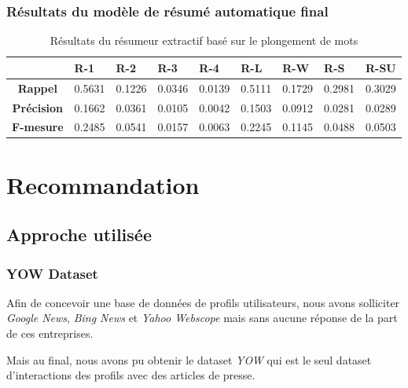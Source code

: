         \subsubsection{Résultats du modèle de résumé automatique final}
        \begin{table}[H]
            \begin{center}
                \begin{tabular}{|c|C{1.2cm}|C{1.2cm}|C{1.2cm}|C{1.2cm}|C{1.2cm}|C{1.2cm}|C{1.2cm}|C{1.2cm}|}
                     & \textbf{R-1} &  \textbf{R-2} &  \textbf{R-3} &  \textbf{R-4} &  \textbf{R-L} &  \textbf{R-W} &  \textbf{R-S} &  \textbf{R-SU} \\
                    \hline
                    \textbf{Rappel} & 0.5631 & 0.1226 & 0.0346 & 0.0139 & 0.5111 & 0.1729 & 0.2981 & 0.3029 \\
                    \hline
                    \textbf{Précision} & 0.1662 & 0.0361 & 0.0105 & 0.0042 & 0.1503 & 0.0912 & 0.0281 & 0.0289 \\
                    \hline
                    \textbf{F-mesure} & 0.2485 & 0.0541 & 0.0157 & 0.0063 & 0.2245 & 0.1145 & 0.0488 & 0.0503 \\
                    \hline
                \end{tabular}
             \end{center}
            \caption{Résultats du résumeur extractif basé sur le plongement de mots}
            \label{result-boltzman}
        \end{table}

\section{Recommandation}
    \subsection{Approche utilisée}    
        \subsubsection{YOW Dataset}
        Afin de concevoir une base de données de profils utilisateurs, nous avons solliciter \emph{Google News}, \emph{Bing News} et \emph{Yahoo Webscope} mais sans aucune réponse de la part de ces entreprises. 

        Mais au final, nous avons pu obtenir le dataset \emph{YOW} qui est le seul dataset d'interactions des profils avec des articles de presse. 

